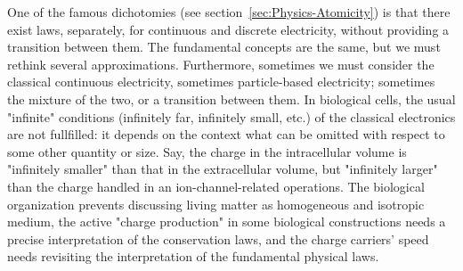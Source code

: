 One of the famous dichotomies (see section~\ref{sec:Physics-Atomicity}) is that there exist laws, separately,
for continuous and discrete electricity, without providing
a transition between them.
The fundamental concepts are the same, but we must rethink several approximations. Furthermore, sometimes we must consider the classical continuous electricity, sometimes particle-based electricity; sometimes the mixture of the two, or a transition
between them. In biological cells, the usual "infinite" conditions (infinitely far, infinitely small, etc.)
of the classical electronics are not fullfilled: it depends on the context what can be omitted with respect to some other quantity or size.
Say, the charge in the intracellular volume is "infinitely smaller" than that in the extracellular volume, but "infinitely larger" than the charge handled in an ion-channel-related operations.
The biological organization prevents discussing living matter 
as homogeneous and isotropic medium, the active "charge production" in some biological constructions needs a precise interpretation of the conservation laws, and the charge carriers' speed needs revisiting the interpretation of the fundamental physical laws.

\fi



%
%
